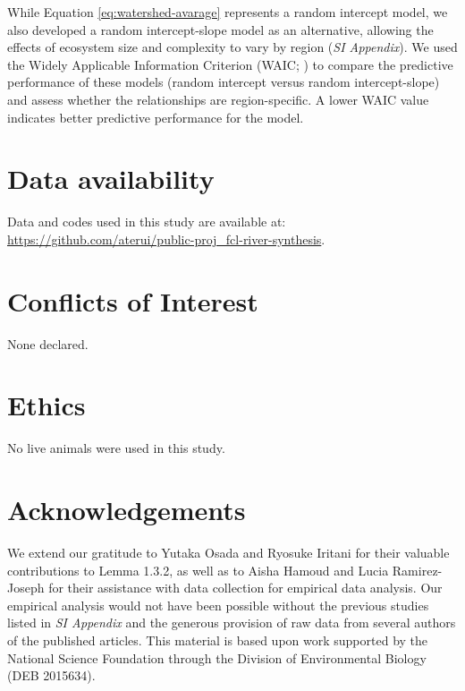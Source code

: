 \documentclass[11pt, class=article, crop=false]{standalone}
\begin{document}
While Equation \ref{eq:watershed-avarage} represents a random intercept model, we also developed a random intercept-slope model as an alternative, allowing the effects of ecosystem size and complexity to vary by region (\textit{SI Appendix}).
We used the Widely Applicable Information Criterion (WAIC; \citep{watanabe_asymptotic_2010}) to compare the predictive performance of these models (random intercept versus random intercept-slope) and assess whether the relationships are region-specific.
A lower WAIC value indicates better predictive performance for the model.

\section{Data availability}

Data and codes used in this study are available at:
\url{https://github.com/aterui/public-proj_fcl-river-synthesis}.

\section{Conflicts of Interest}

None declared.

\section{Ethics}

No live animals were used in this study.

\section{Acknowledgements}

We extend our gratitude to Yutaka Osada and Ryosuke Iritani for their valuable contributions to Lemma 1.3.2, as well as to Aisha Hamoud and Lucia Ramirez-Joseph for their assistance with data collection for empirical data analysis.
Our empirical analysis would not have been possible without the previous studies listed in \textit{SI Appendix} and the generous provision of raw data from several authors of the published articles.
This material is based upon work supported by the National Science Foundation through the Division of Environmental Biology (DEB 2015634).

\newpage


\end{document}
